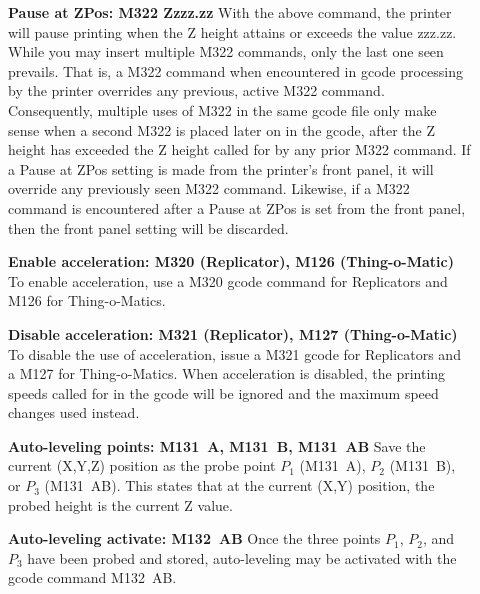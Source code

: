 \begin{description}
\item[] \textbf{Pause at ZPos: M322 Zzzz.zz}
\newline
With the above command, the printer will pause printing when the Z
height attains or exceeds the value zzz.zz. While you may insert multiple M322
commands, only the last one seen prevails. That is, a M322 command when
encountered in gcode processing by the printer overrides any previous, active M322
command.  Consequently, multiple uses of M322 in the same gcode file only make
sense when a second M322 is placed later on in the gcode, after the Z height
has exceeded the Z height called for by any prior M322 command.  If a
Pause at ZPos setting is made from the printer's front panel, it will override
any previously seen M322 command.  Likewise, if a M322 command is encountered
after a Pause at ZPos is set from the front panel, then the front panel setting
will be discarded.
\item[] \textbf{Enable acceleration: M320 (Replicator), M126 (Thing-o-Matic)}
\newline
To enable acceleration, use a M320 gcode command for Replicators and
M126 for Thing-o-Matics. 
\item[] \textbf{Disable acceleration: M321 (Replicator), M127 (Thing-o-Matic)}
\newline To disable the use of acceleration, issue a M321 gcode for
Replicators and a M127 for Thing-o-Matics.  When acceleration is disabled, the
printing speeds called for in the gcode will be ignored and the maximum speed
changes used instead.
\item[] \textbf{Auto-leveling points: M131~A, M131~B, M131~AB}
\newline Save the current (X,Y,Z) position as the probe point $P_1$ (M131~A),
$P_2$ (M131~B), or $P_3$ (M131~AB).  This states that at the current
(X,Y) position, the probed height is the current Z value.
\item[] \textbf{Auto-leveling activate: M132~AB}
\newline Once the three points $P_1$, $P_2$, and $P_3$ have been probed and
stored, auto-leveling may be activated with the gcode command M132~AB.
\end{description}
